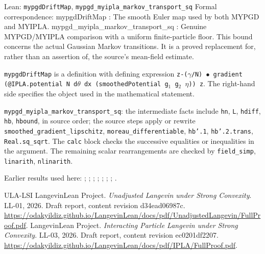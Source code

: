 \documentclass[11pt,a4paper]{article}
\begin{document}
\begin{leanbox}{Lean: \texttt{mypgdDriftMap}, \texttt{mypgd\_\allowbreak{}myipla\_\allowbreak{}markov\_\allowbreak{}transport\_\allowbreak{}sq}}
Formal correspondence: mypgdDriftMap : The smooth Euler map used by both MYPGD and MYIPLA. mypgd\_myipla\_markov\_transport\_sq : Genuine MYPGD/\allowbreak{}MYIPLA comparison with a uniform finite-particle floor. This bound concerns the actual Gaussian Markov transitions. It is a proved replacement for, rather than an assertion of, the source's mean-field estimate.



\texttt{mypgd\allowbreak{}Drift\allowbreak{}Map} is a definition with defining expression \texttt{z-\allowbreak{}(\ensuremath{\gamma}/\allowbreak{}N) \ensuremath{\bullet} gradient (@IPLA.\allowbreak{}potential N d\ensuremath{\theta} dx (smoothed\allowbreak{}Potential g\ensuremath{{}_{1}} g\ensuremath{{}_{2}} \ensuremath{\eta})) z}. The right-hand side specifies the object used in the mathematical statement.



\texttt{mypgd\_\allowbreak{}myipla\_\allowbreak{}markov\_\allowbreak{}transport\_\allowbreak{}sq}: the intermediate facts include \texttt{hn}, \texttt{L}, \texttt{hdiff}, \texttt{hb}, \texttt{hbound}, in source order; the source steps apply or rewrite \texttt{smoothed\_\allowbreak{}gradient\_\allowbreak{}lipschitz}, \texttt{moreau\_\allowbreak{}differentiable}, \texttt{hb'.\allowbreak{}1}, \texttt{hb'.\allowbreak{}2.\allowbreak{}trans}, \texttt{Real.\allowbreak{}sq\_\allowbreak{}sqrt}. The \texttt{calc} block checks the successive equalities or inequalities in the argument. The remaining scalar rearrangements are checked by \texttt{field\_\allowbreak{}simp}, \texttt{linarith}, \texttt{nlinarith}.
\end{leanbox}


Earlier results used here: \cite[Section~3.10.7]{LangevinLean2026ULASC}; \cite[Section~3.17.3]{LangevinLean2026ULASC}; \cite[Section~3.17.4]{LangevinLean2026ULASC}; \cite[Section~3.33.6]{LangevinLean2026ULASC}; \cite[Section~3.1.1]{LangevinLean2026IPLA}; \cite[Section~3.1.3]{LangevinLean2026IPLA}; \cite[Section~3.1.4]{LangevinLean2026IPLA}; \cite[Section~3.7.1]{LangevinLean2026IPLA}.

\begin{thebibliography}{ULA-LSI}
LangevinLean Project. \emph{Unadjusted Langevin under Strong Convexity}. LL-01, 2026. Draft report, content revision d34ead06987c. \url{https://odakyildiz.github.io/LangevinLean/docs/pdf/UnadjustedLangevin/FullProof.pdf}.
LangevinLean Project. \emph{Interacting Particle Langevin under Strong Convexity}. LL-03, 2026. Draft report, content revision ec0201df2207. \url{https://odakyildiz.github.io/LangevinLean/docs/pdf/IPLA/FullProof.pdf}.
\end{thebibliography}
\end{document}
